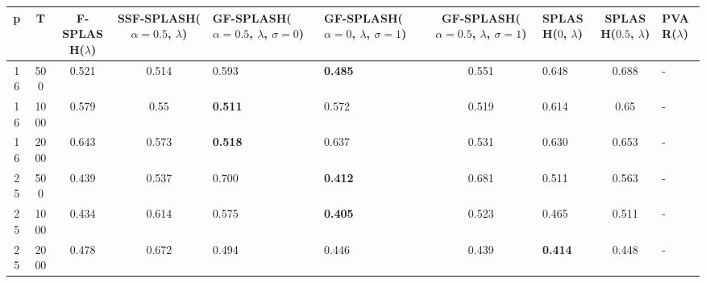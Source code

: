 \begin{tabular}{ccccllclcl}
\hline
  p  &  T   &  F-SPLASH($\lambda$)  &  SSF-SPLASH($\alpha=0.5$, $\lambda$)  & GF-SPLASH($\alpha=0.5$, $\lambda$, $\sigma=0$)   & GF-SPLASH($\alpha=0$, $\lambda$, $\sigma=1$)   &  GF-SPLASH($\alpha=0.5$, $\lambda$, $\sigma=1$)  & SPLASH($0$, $\lambda$)   &  SPLASH($0.5$, $\lambda$)  & PVAR($\lambda$)   \\
\hline
 16  & 500  &         0.521         &                 0.514                 & 0.593                                            & \textbf{0.485}                                 &                      0.551                       & 0.648                    &           0.688            & -                 \\
 16  & 1000 &         0.579         &                 0.55                  & \textbf{0.511}                                   & 0.572                                          &                      0.519                       & 0.614                    &            0.65            & -                 \\
 16  & 2000 &         0.643         &                 0.573                 & \textbf{0.518}                                   & 0.637                                          &                      0.531                       & 0.630                    &           0.653            & -                 \\
 25  & 500  &         0.439         &                 0.537                 & 0.700                                            & \textbf{0.412}                                 &                      0.681                       & 0.511                    &           0.563            & -                 \\
 25  & 1000 &         0.434         &                 0.614                 & 0.575                                            & \textbf{0.405}                                 &                      0.523                       & 0.465                    &           0.511            & -                 \\
 25  & 2000 &         0.478         &                 0.672                 & 0.494                                            & 0.446                                          &                      0.439                       & \textbf{0.414}           &           0.448            & -                 \\
\hline
\end{tabular}